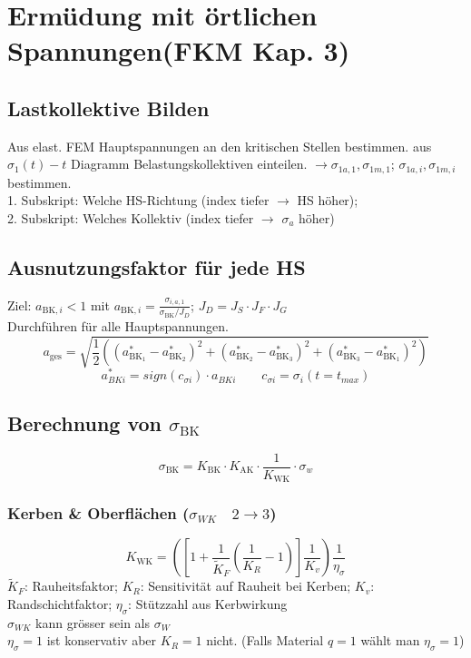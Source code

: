 \section{Ermüdung mit örtlichen Spannungen(FKM Kap. 3)}
    \subsection{Lastkollektive Bilden}
    Aus elast. FEM Hauptspannungen an den kritischen Stellen bestimmen.
    aus $\sigma_1(t)-t$ Diagramm Belastungskollektiven einteilen. $\rightarrow \sigma_{1a,1}, \sigma_{1m,1}$; $\sigma_{1a,i}, \sigma_{1m,i}$ bestimmen.
    \\1. Subskript: Welche HS-Richtung (index tiefer $\rightarrow$ HS höher); 
    \\2. Subskript: Welches Kollektiv (index tiefer $\rightarrow$ $\sigma_a$ höher)
    \subsection{Ausnutzungsfaktor für jede HS}
        Ziel: $a_{\textrm{BK},i} < 1$ mit $\displaystyle a_{\textrm{BK},i} = \frac{\sigma_{i,a,1}}{\sigma_{\textrm{BK}}/J_D}$; \quad $J_D=J_S\cdot J_F \cdot J_G$ 
        \\Durchführen für alle Hauptspannungen.
        \[a_{\textrm{ges}}=\sqrt{\frac{1}{2}\left((a_{\textrm{BK}_1}^{*}-a_{\textrm{BK}_2}^{*})^{2}+(a_{\textrm{BK}_2}^{*}-a_{\textrm{BK}_3}^{*})^{2}+(a_{\textrm{BK}_3}^{*}-a_{\textrm{BK}_1}^{*})^{2}\right)}\]
        \[a_{BKi}^*=sign(c_{\sigma i})\cdot a_{BKi} \qquad c_{\sigma i}= \sigma_i(t=t_{max})\]
    \subsection{Berechnung von $\sigma_{\textrm{BK}}$}
        \[\sigma_{\textrm{BK}} = K_{\textrm{BK}} \cdot K_{\textrm{AK}} \cdot \frac{1}{K_{\textrm{WK}}} \cdot \sigma_w \]
        \subsubsection{Kerben \& Oberflächen ($\sigma_{WK}\quad2\rightarrow3$)}
            \[K_{\textrm{WK}}=\left(\left[1+\frac{1}{\widetilde{K}_F}\left(\frac{1}{K_R}-1\right)\right]\frac{1}{K_v}\right)\frac{1}{\eta_{\sigma}}\]
            $\widetilde{K}_F$: Rauheitsfaktor;   $K_R$: Sensitivität auf Rauheit bei Kerben;     $K_v$: Randschichtfaktor;   $\eta_{\sigma}$: Stützzahl aus Kerbwirkung
            \\$\sigma_{WK}$ kann grösser sein als $\sigma_W$
            \\$\eta_{\sigma}=1$ ist konservativ aber $K_R=1$ nicht. (Falls Material $q=1$ wählt man $\eta_{\sigma}=1$)
